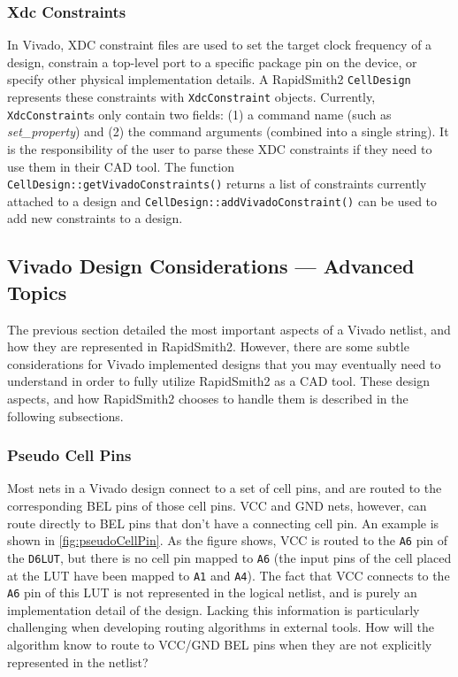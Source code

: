 \subsubsection{Xdc Constraints}
In Vivado, XDC constraint files are used to set the target clock frequency of a
design, constrain a top-level port to a specific package pin on the device, or
specify other physical implementation details. A RapidSmith2 \texttt{CellDesign}
represents these constraints with \texttt{XdcConstraint} objects. Currently,
\texttt{XdcConstraint}s only contain two fields: (1) a command name
(such as \textit{set\_property}) and (2) the command arguments (combined into a
single string). It is the responsibility of the user to parse these XDC
constraints if they need to use them in their CAD tool. The function
\texttt{CellDesign::getVivadoConstraints()} returns a list of constraints
currently attached to a design and \texttt{CellDesign::addVivadoConstraint()}
can be used to add new constraints to a design.

\subsection{Vivado Design Considerations --- Advanced Topics}
The previous section detailed the most important aspects of a Vivado 
netlist, and how they are represented in RapidSmith2. However, there are some
subtle considerations for Vivado implemented designs that you may eventually
need to understand in order to fully utilize RapidSmith2 as a CAD tool. These
design aspects, and how RapidSmith2 chooses to handle them is described in the
following subsections.

\subsubsection{Pseudo Cell Pins} \label{sec:pseudoCellPin}
Most nets in a Vivado design connect to a set of cell pins, and are routed to
the corresponding BEL pins of those cell pins. VCC and GND nets,
however, can route directly to BEL pins that don't have a connecting cell pin.
An example is shown in \autoref{fig:pseudoCellPin}. As the figure shows, VCC is
routed to the \texttt{A6} pin of the \texttt{D6LUT}, but there is no cell pin
mapped to \texttt{A6} (the input pins of the cell placed at the LUT have
been mapped to \texttt{A1} and \texttt{A4}). The fact that VCC connects to the
\texttt{A6} pin of this LUT is not represented in the logical netlist, and is purely an
implementation detail of the design. Lacking this information is particularly
challenging when developing routing algorithms in external tools. How will the
algorithm know to route to VCC/GND BEL pins when they are not explicitly
represented in the netlist?

